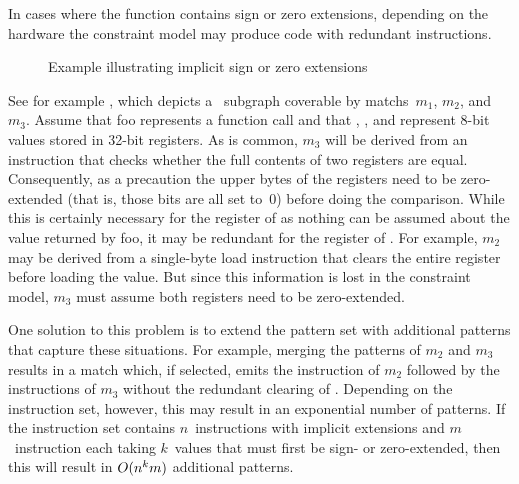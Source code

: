 In cases where the \gls{function} contains sign or zero extensions, depending on
the hardware the \gls{constraint model} may produce code with redundant
\glspl{instruction}.
%
\begin{figure}
  \centering%
  

  \caption{Example illustrating implicit sign or zero extensions}%
\end{figure}
%
See for example , which depicts a
~\gls{subgraph} coverable by \glspl{match}~$m_1$, $m_2$,
and~$m_3$.
%
Assume that {\irFont foo} represents a \gls{function} call and that ,
, and  represent 8-bit values stored in 32-bit
\glspl{register}.
%
As is common, $m_3$ will be derived from an \gls{instruction} that checks
whether the full contents of two \glspl{register} are equal.
%
Consequently, as a precaution the upper bytes of the \glspl{register} need to be
zero-extended (that is, those bits are all set to~0) before doing the
comparison.
%
While this is certainly necessary for the \gls{register} of  as nothing
can be assumed about the value returned by {\irFont foo}, it may be redundant
for the register of .
%
For example, $m_2$ may be derived from a single-byte load \gls{instruction} that
clears the entire \gls{register} before loading the value.
%
But since this information is lost in the \gls{constraint model}, $m_3$ must
assume both \glspl{register} need to be zero-extended.

One solution to this problem is to extend the \gls{pattern set} with additional
\glspl{pattern} that capture these situations.
%
For example, merging the \glspl{pattern} of $m_2$ and $m_3$ results in a
\gls{match} which, if selected, emits the \gls{instruction} of $m_2$ followed by
the \glspl{instruction} of $m_3$ without the redundant clearing of .
%
Depending on the \gls{instruction set}, however, this may result in an
exponential number of \glspl{pattern}.
%
If the \gls{instruction set} contains $n$~\glspl{instruction} with implicit
extensions and $m$~\gls{instruction} each taking $k$~values that must first be
sign- or zero-extended, then this will result in $O(n^k m)$ additional
\glspl{pattern}.

